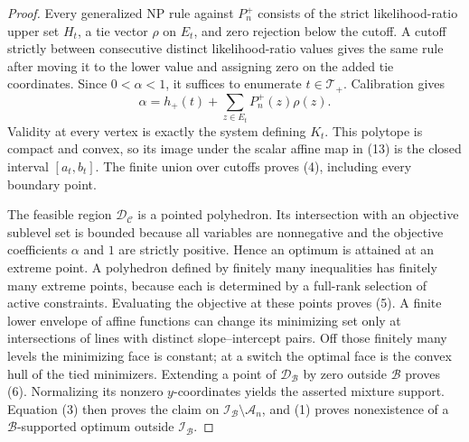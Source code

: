 \documentclass{article}
\begin{document}
\begin{proof}
Every generalized NP rule against \(P_n^+\) consists of the strict likelihood-ratio upper set \(H_t\), a tie vector \(\rho\) on \(E_t\), and zero rejection below the cutoff. A cutoff strictly between consecutive distinct likelihood-ratio values gives the same rule after moving it to the lower value and assigning zero on the added tie coordinates. Since \(0<\alpha<1\), it suffices to enumerate \(t\in\mathcal T_+\). Calibration gives
\[
 \alpha=h_+(t)+\sum_{z\in E_t}P_n^+(z)\rho(z).\tag{13}
\]
Validity at every vertex is exactly the system defining \(K_t\). This polytope is compact and convex, so its image under the scalar affine map in (13) is the closed interval \([a_t,b_t]\). The finite union over cutoffs proves (4), including every boundary point.

The feasible region \(\mathcal D_{\mathcal C}\) is a pointed polyhedron. Its intersection with an objective sublevel set is bounded because all variables are nonnegative and the objective coefficients \(\alpha\) and \(1\) are strictly positive. Hence an optimum is attained at an extreme point. A polyhedron defined by finitely many inequalities has finitely many extreme points, because each is determined by a full-rank selection of active constraints. Evaluating the objective at these points proves (5). A finite lower envelope of affine functions can change its minimizing set only at intersections of lines with distinct slope--intercept pairs. Off those finitely many levels the minimizing face is constant; at a switch the optimal face is the convex hull of the tied minimizers. Extending a point of \(\mathcal D_{\mathcal B}\) by zero outside \(\mathcal B\) proves (6). Normalizing its nonzero \(y\)-coordinates yields the asserted mixture support. Equation (3) then proves the claim on \(\mathcal I_{\mathcal B}\setminus\mathcal A_n\), and (1) proves nonexistence of a \(\mathcal B\)-supported optimum outside \(\mathcal I_{\mathcal B}\).


\end{proof}
\end{document}

